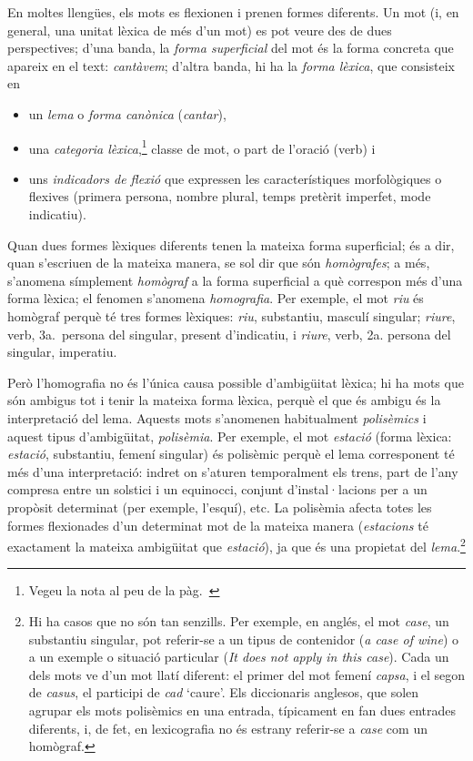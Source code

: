 En moltes llengües, els mots es flexionen i prenen formes diferents.
Un mot (i, en general, una unitat lèxica de més d'un mot) es pot veure
des de dues perspectives; d'una banda, la \emph{forma superficial}
del mot és la forma concreta que apareix en el text: \emph{cantàvem};
d'altra banda, hi ha la \emph{forma lèxica}, que consisteix en
\begin{itemize}
\item un \emph{lema} o \emph{forma canònica} (\emph{cantar}), 
\item una \emph{categoria lèxica},\label{pg:catlex}\footnote{Vegeu la nota al peu  de la pàg.~\pageref{pg:catgra}} classe de mot, o part de l'oració
  (verb) i 
\item uns \emph{indicadors de flexió} que expressen les característiques
morfològiques o flexives (primera persona, nombre plural, temps
pretèrit imperfet, mode indicatiu). 
\end{itemize}
Quan dues formes lèxiques diferents tenen la mateixa forma
superficial; és a dir, quan s'escriuen de la mateixa manera, se sol dir que
són \emph{homògrafes}\label{pg:homografia}; a més, s'anomena símplement \emph{homògraf} a
la forma superficial a què correspon més d'una forma lèxica; el
fenomen s'anomena \emph{homografia}. Per exemple, el mot \emph{riu} és
homògraf perquè té tres formes lèxiques: \emph{riu}, substantiu,
masculí singular; \emph{riure}, verb, 3a.\ persona del singular,
present d'indicatiu, i \emph{riure}, verb, 2a. persona del singular,
imperatiu.

Però l'homografia no és l'única causa possible d'ambigüitat lèxica; hi
ha mots que són ambigus tot i tenir la mateixa forma lèxica, perquè el
que és ambigu és la interpretació del lema. Aquests mots s'anomenen
habitualment \emph{polisèmics} i aquest tipus d'ambigüitat,
\emph{polisèmia}. Per exemple, el mot \emph{estació} (forma lèxica:
\emph{estació}, substantiu, femení singular) és polisèmic perquè el
lema corresponent té més d'una interpretació: indret on s'aturen
temporalment els trens, part de l'any compresa entre un solstici i un
equinocci, conjunt d'instal·lacions per a un propòsit determinat (per
exemple, l'esquí), etc. La polisèmia afecta totes les formes
flexionades d'un determinat mot de la mateixa manera (\emph{estacions}
té exactament la mateixa ambigüitat que \emph{estació}), ja que és una
propietat del \emph{lema}.\footnote{Hi ha casos que no són tan
  senzills. Per exemple, en anglés, el mot \emph{case}, un substantiu
  singular, pot referir-se a un tipus de contenidor (\emph{a case of
    wine}) o a un exemple o situació particular (\emph{It does not
    apply in this case}). Cada un dels mots ve d'un mot llatí
  diferent: el primer del mot femení \emph{capsa}, i el segon de
  \emph{casus}, el participi de \emph{cad} `caure'. Els
  diccionaris anglesos, que solen agrupar els mots polisèmics en una
  entrada, típicament en fan dues entrades diferents, i, de fet, en
  lexicografia no és estrany referir-se a \emph{case} com un
  homògraf.}

